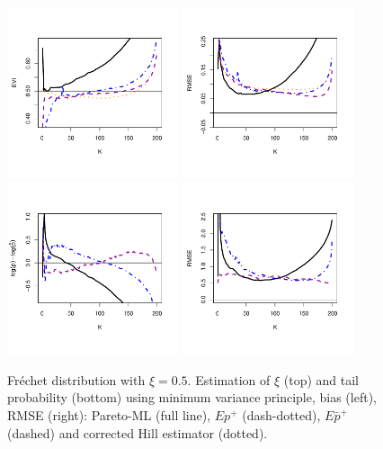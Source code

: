 \documentclass[twoside,leqno,11pt]{article}
\begin{document}
 \begin{figure}[!ht]
  \centering
  \includegraphics[width=0.45\textwidth]{frechetPareto_evi.pdf} 
\includegraphics[width=0.45\textwidth]{frechetPareto_rmse.pdf} \\
\includegraphics[width=0.45\textwidth]{frechetPareto_tail.pdf}
\includegraphics[width=0.45\textwidth]{frechetPareto_tail_rmse.pdf} 
\caption{Fr\'echet distribution with $\xi=0.5$. Estimation of $\xi$ (top) and tail probability (bottom) using minimum variance principle, bias (left), RMSE (right): Pareto-ML  (full line), $Ep^+$ (dash-dotted), $E\bar{p}^+$ (dashed) and corrected Hill estimator (dotted).}
  \end{figure}
\end{document}
